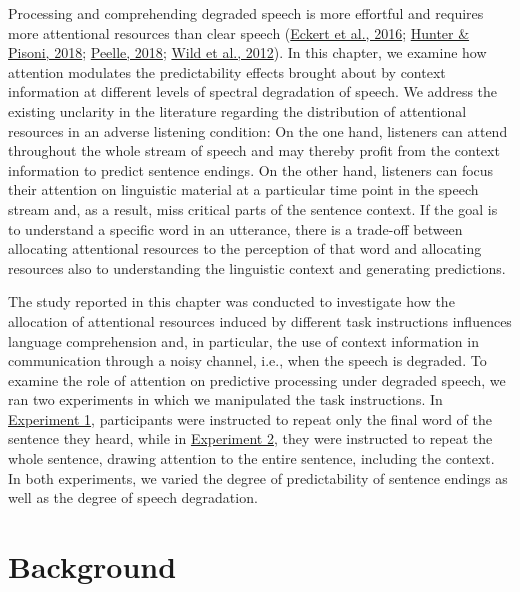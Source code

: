 \documentclass[a4paper, nobind]{templates/ociamthesis}
\begin{document}
Processing and comprehending degraded speech is more effortful and requires more attentional resources than clear speech (\protect\hyperlink{ref-Eckert2016}{Eckert et al., 2016}; \protect\hyperlink{ref-Hunter2018}{Hunter \& Pisoni, 2018}; \protect\hyperlink{ref-Peelle2018}{Peelle, 2018}; \protect\hyperlink{ref-Wild2012}{Wild et al., 2012}).
In this chapter, we examine how attention modulates the predictability effects brought about by context information at different levels of spectral degradation of speech.
We address the existing unclarity in the literature regarding the distribution of attentional resources in an adverse listening condition:
On the one hand, listeners can attend throughout the whole stream of speech and may thereby profit from the context information to predict sentence endings.
On the other hand, listeners can focus their attention on linguistic material at a particular time point in the speech stream and, as a result, miss critical parts of the sentence context.
If the goal is to understand a specific word in an utterance, there is a trade-off between allocating attentional resources to the perception of that word and allocating resources also to understanding the linguistic context and generating predictions.

The study reported in this chapter was conducted to investigate how the allocation of attentional resources induced by different task instructions influences language comprehension and, in particular, the use of context information in communication through a noisy channel, i.e., when the speech is degraded.
To examine the role of attention on predictive processing under degraded speech, we ran two experiments in which we manipulated the task instructions.
In \protect\hyperlink{experiment1a}{Experiment 1}, participants were instructed to repeat only the final word of the sentence they heard,
while in \protect\hyperlink{experiment1b}{Experiment 2}, they were instructed to repeat the whole sentence, drawing attention to the entire sentence, including the context.
In both experiments, we varied the degree of predictability of sentence endings as well as the degree of speech degradation.

\hypertarget{background}{%
\section{Background}\label{background}}
\end{document}
